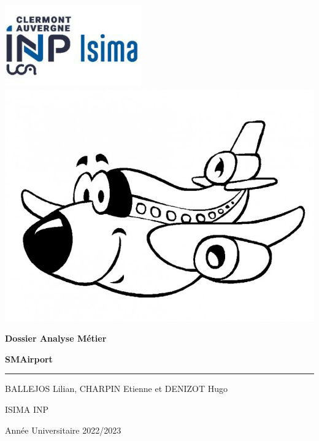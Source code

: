 \documentclass[12pt,french]{article} %
\begin{document}
\begin{titlepage} %

  
  \includegraphics[scale=0.6]{isima.png}
  \includegraphics[scale=0.2]{deco.jpg}
  
  \vspace*{2.5cm} %
  
  \begin{center}\huge
    \textbf{Dossier Analyse Métier} 
    
    \textbf{SMAirport}
  \end{center}
  
  \hrule %
  
  \begin{center}
    \Large BALLEJOS Lilian,
    \Large CHARPIN Etienne et
    \Large DENIZOT Hugo
    
    \large
    
    ISIMA INP
  
    Année Universitaire 2022/2023
  \end{center}
  
  \begin{center}
  \end{center}
  

\end{titlepage}
\end{document}
